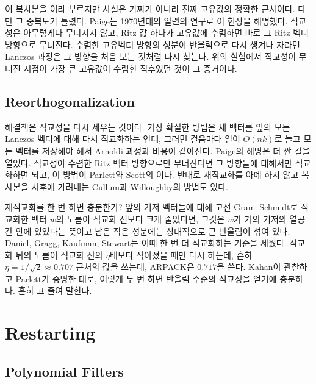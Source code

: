 이 복사본을 이라 부르지만 사실은 가짜가 아니라 진짜 고유값의 정확한 근사이다. 다만 그 중복도가 틀렸다. Paige는 1970년대의 일련의 연구로 이 현상을 해명했다\cite{paige1976error}. 직교성은 아무렇게나 무너지지 않고, Ritz 값 하나가 고유값에 수렴하면 바로 그 Ritz 벡터 방향으로 무너진다. 수렴한 고유벡터 방향의 성분이 반올림으로 다시 생겨나 자라면 Lanczos 과정은 그 방향을 처음 보는 것처럼 다시 찾는다. 위의 실험에서 직교성이 무너진 시점이 가장 큰 고유값이 수렴한 직후였던 것이 그 증거이다.

\subsection{Reorthogonalization}

해결책은 직교성을 다시 세우는 것이다. 가장 확실한 방법은 새 벡터를 앞의 모든 Lanczos 벡터에 대해 다시 직교화하는 인데, 그러면 걸음마다 일이 $O(nk)$로 늘고 모든 벡터를 저장해야 해서 Arnoldi 과정과 비용이 같아진다. Paige의 해명은 더 싼 길을 열었다. 직교성이 수렴한 Ritz 벡터 방향으로만 무너진다면 그 방향들에 대해서만 직교화하면 되고, 이 방법이 Parlett와 Scott의 이다\cite{parlett1979selective}. 반대로 재직교화를 아예 하지 않고 복사본을 사후에 가려내는 Cullum과 Willoughby의 방법도 있다\cite{cullum1985}.

재직교화를 한 번 하면 충분한가? 앞의 기저 벡터들에 대해 고전 Gram--Schmidt로 직교화한 벡터 $w$의 노름이 직교화 전보다 크게 줄었다면, 그것은 $w$가 거의 기저의 열공간 안에 있었다는 뜻이고 남은 작은 성분에는 상대적으로 큰 반올림이 섞여 있다. Daniel, Gragg, Kaufman, Stewart는 이때 한 번 더 직교화하는 기준을 세웠다\cite{daniel1976dgks}. 직교화 뒤의 노름이 직교화 전의 $\eta$배보다 작아졌을 때만 다시 하는데, 흔히 $\eta=1/\sqrt2\approx0.707$ 근처의 값을 쓰는데, ARPACK은 $0.717$을 쓴다. Kahan이 관찰하고 Parlett가 증명한 대로, 이렇게 두 번 하면 반올림 수준의 직교성을 얻기에 충분하다\cite{parlett1998}. 흔히 고 줄여 말한다.

\section{Restarting}
\label{sec:restart}

\subsection{Polynomial Filters}

